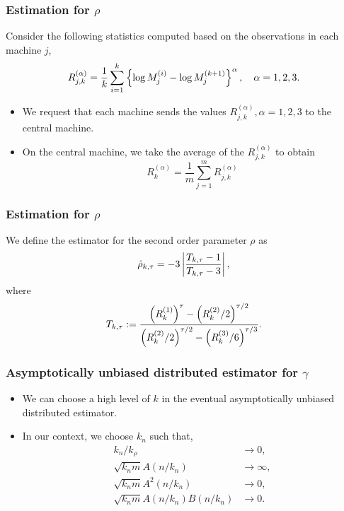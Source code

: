 \documentclass{beamer}
\begin{document}
\begin{frame}
    \frametitle{Estimation for $\rho$}
Consider the following statistics computed based on the observations in each machine $j$,
$$
R_{j,k}^{(\alpha)} = \frac{1}{k}\sum_{i=1}^{k} \left\{\log M_{j}^{(i)} -\log M_j^{(k+1)}\right\}^{\alpha}, \quad \alpha=1,2,3.
$$

\begin{itemize}
    \item We request that each machine sends the values $R_{j,k}^{(\alpha)}, \alpha = 1,2,3$ to the central machine. 
    
    \item On the central machine, we take the average of the $R_{j,k}^{(\alpha)}$ to obtain 
    $$
    R_{k}^{(\alpha)} =\frac{1}{m}\sum_{j=1}^m R_{j,k}^{(\alpha)}
    $$
\end{itemize}

\end{frame}


\begin{frame}
    \frametitle{Estimation for $\rho$}
We define the estimator for the second order parameter $\rho$ as 
$$
\hat{\rho}_{k,\tau} = -3\left\vert\frac{T_{k,\tau}-1}{T_{k,\tau}-3}\right\vert,
$$
where 
$$
T_{k,\tau} := \frac{\left(R_k^{(1)}\right)^{\tau}-\left(R_k^{(2)}/2\right)^{\tau/2}}{\left(R_k^{(2)}/2\right)^{\tau/2}-\left(R_k^{(3)}/6\right)^{\tau/3}}.
$$
    

\end{frame}

\begin{frame}
    \frametitle{Asymptotically unbiased distributed estimator for $\gamma$}
    \begin{itemize}
        \item     We can choose a high level of $k$ in the eventual asymptotically unbiased distributed estimator.
        \item In our context, we choose $k_n$ such that,
        $$
            \begin{aligned}
                k_n/k_{\rho} & \to 0,\\
                \sqrt{k_{n}m} A(n/k_{n})&\to\infty,\\
                \sqrt{k_{n}m} A^2(n/k_{n})&\to 0,\\
                 \sqrt{k_{n}m} A(n/k_{n})B(n/k_{n})&\to 0.   
            \end{aligned}
        $$
    \end{itemize}

    

\end{frame}
\end{document}

